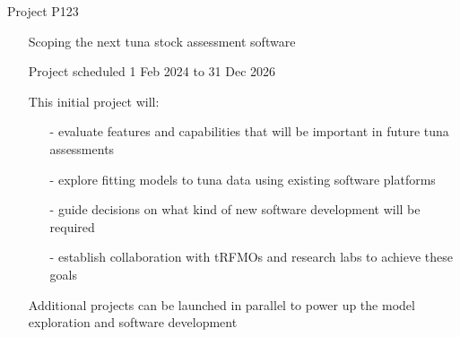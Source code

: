\documentclass[aspectratio=169,fleqn]{beamer}
\begin{document}

\begin{frame}{Project P123}\small
  \begin{itemize}
    \item[] Scoping the next tuna stock assessment software\\[3ex]
    \item[] Project scheduled 1 Feb 2024 to 31 Dec 2026\\[3ex]
    \item[] This initial project will:
    \begin{itemize}
      \item[-] evaluate {\green features and capabilities} that will be
      important in future tuna assessments\\[1ex]
      \item[-] explore fitting models to tuna data using {\green existing
        software platforms}\\[1ex]
      \item[-] guide decisions on what kind of {\green new software development}
      will be required\\[1ex]
      \item[-] establish {\green collaboration} with tRFMOs and research labs to
      achieve these goals\\[3ex]
    \end{itemize}
    Additional projects can be launched in parallel to power up the model
    exploration and software development
  \end{itemize}
\end{frame}

\end{document}
